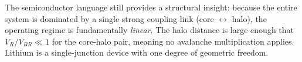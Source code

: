 The semiconductor language still provides a structural insight: because the entire system is dominated by a single strong coupling link (core $\leftrightarrow$ halo), the operating regime is fundamentally \textit{linear}. The halo distance is large enough that $V_R/V_{BR} \ll 1$ for the core-halo pair, meaning no avalanche multiplication applies. Lithium is a single-junction device with one degree of geometric freedom.

